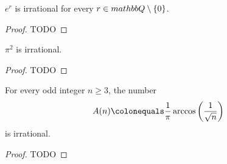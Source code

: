 \begin{theorem}
  \label{e_pow_irrational}
  \label{book.irrational.Theorem_1}
  \leanok
  \(e^r\) is irrational for every \(r\in\\mathbb{Q}\setminus\{0\}\).
\end{theorem}
\begin{proof}
  TODO
\end{proof}


\begin{theorem}
  \label{pi_pow_2_irrational}
  \label{book.irrational.Theorem_2}
  \leanok
  \(\pi^2\) is irrational.
\end{theorem}
\begin{proof}
  TODO
\end{proof}

\begin{theorem}
  \label{arccos_irrational}
  \label{book.irrational.Theorem_3}
  \leanok
  For every odd integer \(n \ge 3\), the number
  \[
  A(n)\colonequals \frac{1}{\pi}\arccos\left(\frac{1}{\sqrt{n}}\right)
  \]
  is irrational.
\end{theorem}
\begin{proof}
  TODO
\end{proof}

